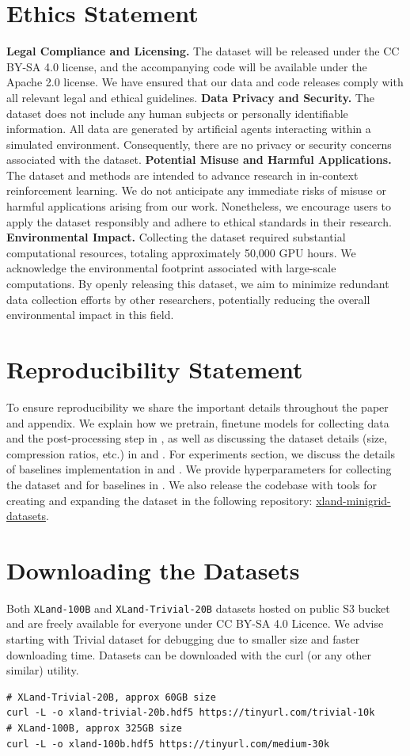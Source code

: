\documentclass{article}
\begin{document}
\section*{Ethics Statement}
\textbf{Legal Compliance and Licensing.} The dataset will be released under the CC BY-SA 4.0 license, and the accompanying code will be available under the Apache 2.0 license. We have ensured that our data and code releases comply with all relevant legal and ethical guidelines.
\textbf{Data Privacy and Security.} The dataset does not include any human subjects or personally identifiable information. All data are generated by artificial agents interacting within a simulated environment. Consequently, there are no privacy or security concerns associated with the dataset.
\textbf{Potential Misuse and Harmful Applications.} The dataset and methods are intended to advance research in in-context reinforcement learning. We do not anticipate any immediate risks of misuse or harmful applications arising from our work. Nonetheless, we encourage users to apply the dataset responsibly and adhere to ethical standards in their research.
\textbf{Environmental Impact.} Collecting the dataset required substantial computational resources, totaling approximately 50,000 GPU hours. We acknowledge the environmental footprint associated with large-scale computations. By openly releasing this dataset, we aim to minimize redundant data collection efforts by other researchers, potentially reducing the overall environmental impact in this field.
\section*{Reproducibility Statement}
To ensure reproducibility we share the important details throughout the paper and appendix. We explain how we pretrain, finetune models for collecting data and the post-processing step in , as well as discussing the dataset details (size, compression ratios, etc.) in  and . For experiments section, we discuss the details of baselines implementation in  and . We provide hyperparameters for collecting the dataset and for baselines in . We also release the codebase with tools for creating and expanding the dataset in the following repository: \href{https://github.com/dunnolab/xland-minigrid-datasets}{xland-minigrid-datasets}.


\newpage
\appendix
\section{Downloading the Datasets}
Both \texttt{XLand-100B} and \texttt{XLand-Trivial-20B} datasets hosted on public S3 bucket and are freely available for everyone under CC BY-SA 4.0 Licence. We advise starting with Trivial dataset for debugging due to smaller size and faster downloading time. Datasets can be downloaded with the curl (or any other similar) utility.
\begin{verbatim}
# XLand-Trivial-20B, approx 60GB size
curl -L -o xland-trivial-20b.hdf5 https://tinyurl.com/trivial-10k
# XLand-100B, approx 325GB size
curl -L -o xland-100b.hdf5 https://tinyurl.com/medium-30k
\end{verbatim}
\end{document}
